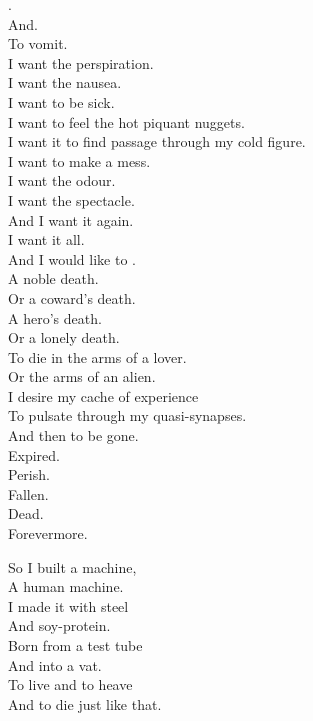 . \\
And. \\
To vomit. \\

I want the perspiration. \\
I want the nausea. \\
I want to be sick. \\
I want to feel the hot piquant nuggets. \\
I want it to find passage through my cold figure. \\
I want to make a mess. \\
I want the odour. \\
I want the spectacle. \\
And I want it again. \\
I want it all. \\

And I would like to . \\
A noble death. \\
Or a coward's death. \\
A hero's death. \\
Or a lonely death. \\
To die in the arms of a lover. \\
Or the arms of an alien. \\
I desire my cache of experience \\
To pulsate through my quasi-synapses. \\
And then to be gone. \\
Expired. \\
Perish. \\
Fallen. \\
Dead. \\
Forevermore. \\





So I built a machine, \\
A human machine. \\
I made it with steel \\
And soy-protein. \\

Born from a test tube \\
And into a vat. \\
To live and to heave \\
And to die just like that. \\

